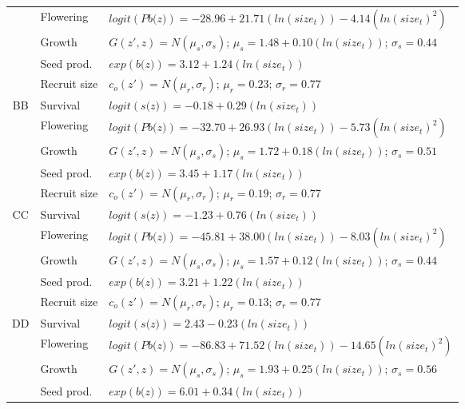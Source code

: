 \documentclass[12pt, letterpaper]{article}
\begin{document}
\begin{spacing}{1.3}
\begin{longtable}[ht]{c|l|p{}}
         & Flowering  & $logit(\textit{Pb(z)})  = -28.96 + 21.71(ln(size_t)) -4.14(ln(size_t)^2)$ \\
         \rowcolor[gray]{.95}& Growth  &  $G(z',z) = N(\mu_s, \sigma_s)$; $\mu_s = 1.48 + 0.10(ln(size_t))$; $\sigma_s = 0.44$\\
         & Seed prod.  & $exp(\textit{b(z)}) = 3.12 + 1.24(ln(size_t))$  \\
         \rowcolor[gray]{.95}& Recruit size  &  $c_o(z') = N(\mu_r, \sigma_r)$; $\mu_r = 0.23$; $\sigma_r = 0.77$ \\
         \hline
         BB  &  Survival  &  $logit(\textit{s(z)})= -0.18 + 0.29(ln(size_t))$ \\
         \rowcolor[gray]{.95}& Flowering  & $logit(\textit{Pb(z)})  = -32.70 + 26.93(ln(size_t)) -5.73(ln(size_t)^2)$ \\
         & Growth  &  $G(z',z) = N(\mu_s, \sigma_s)$; $\mu_s = 1.72 + 0.18(ln(size_t))$; $\sigma_s = 0.51$\\
         \rowcolor[gray]{.95}& Seed prod.  & $exp(\textit{b(z)}) = 3.45 + 1.17(ln(size_t))$  \\
         & Recruit size  &  $c_o(z') = N(\mu_r, \sigma_r)$; $\mu_r = 0.19$; $\sigma_r = 0.77$ \\
         \hline
         \rowcolor[gray]{.95}CC  &  Survival  &  $logit(\textit{s(z)})= -1.23 + 0.76(ln(size_t))$ \\
         & Flowering  & $logit(\textit{Pb(z)})  = -45.81 + 38.00(ln(size_t)) -8.03(ln(size_t)^2)$ \\
         \rowcolor[gray]{.95}& Growth  &  $G(z',z) = N(\mu_s, \sigma_s)$; $\mu_s = 1.57 + 0.12(ln(size_t))$; $\sigma_s = 0.44$\\
         & Seed prod.  & $exp(\textit{b(z)}) = 3.21 + 1.22(ln(size_t))$  \\
         \rowcolor[gray]{.95}& Recruit size  &  $c_o(z') = N(\mu_r, \sigma_r)$; $\mu_r = 0.13$; $\sigma_r = 0.77$ \\
         \hline
         DD  &  Survival  &  $logit(\textit{s(z)})= 2.43-0.23(ln(size_t))$ \\
         \rowcolor[gray]{.95}& Flowering  & $logit(\textit{Pb(z)})  = -86.83 + 71.52(ln(size_t)) -14.65(ln(size_t)^2)$ \\
         & Growth  &  $G(z',z) = N(\mu_s, \sigma_s)$; $\mu_s = 1.93 + 0.25(ln(size_t))$; $\sigma_s = 0.56$\\
         \rowcolor[gray]{.95}& Seed prod.  & $exp(\textit{b(z)}) = 6.01 + 0.34(ln(size_t))$  \\

\end{longtable}
\end{spacing}
\end{document}
